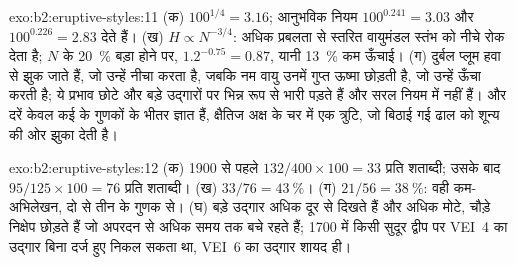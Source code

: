 \begin{solution}{exo:b2:eruptive-styles:11}
(क) $100^{1/4} = 3.16$; आनुभविक नियम $100^{0.241} = 3.03$ और
$100^{0.226} = 2.83$ देते हैं। (ख) $H \propto N^{-3/4}$: अधिक प्रबलता से स्तरित
वायुमंडल स्तंभ को नीचे रोक देता है; $N$ के \qty{20}{\percent} बड़ा होने पर,
$1.2^{-0.75} = 0.87$, यानी \qty{13}{\percent} कम ऊँचाई। (ग) दुर्बल प्लूम
हवा से झुक जाते हैं, जो उन्हें नीचा करता है, जबकि नम वायु उनमें गुप्त ऊष्मा छोड़ती है,
जो उन्हें ऊँचा करती है; ये प्रभाव छोटे और बड़े उद्गारों पर भिन्न रूप से भारी पड़ते हैं
और सरल नियम में नहीं हैं। और दरें केवल कई के
गुणकों के भीतर ज्ञात हैं, क्षैतिज अक्ष के चर में एक त्रुटि, जो
बिठाई गई ढाल को शून्य की ओर झुका देती है।
\end{solution}

\begin{solution}{exo:b2:eruptive-styles:12}
(क) 1900 से पहले $132/400\times100 = 33$ प्रति शताब्दी; उसके बाद $95/125\times100 = 76$ प्रति
शताब्दी। (ख) $33/76 = \qty{43}{\percent}$। (ग) $21/56 = \qty{38}{\percent}$:
वही कम-अभिलेखन, दो से तीन के गुणक से। (घ) बड़े उद्गार
अधिक दूर से दिखते हैं और अधिक मोटे, चौड़े निक्षेप छोड़ते हैं जो अपरदन से अधिक समय तक
बचे रहते हैं; 1700 में किसी सुदूर द्वीप पर VEI~4 का उद्गार बिना दर्ज हुए निकल सकता था,
VEI~6 का उद्गार शायद ही।
\end{solution}

